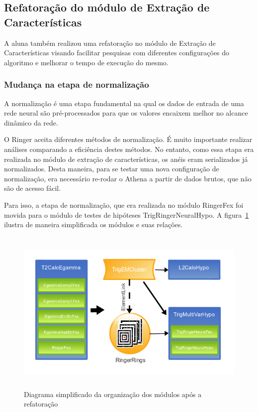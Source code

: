 \documentclass[a4paper,10pt,titlepage]{article}
\begin{document}
\subsection{Refatoração do módulo de Extração de Características}

A aluna também realizou uma refatoração no módulo de Extração de Características visando facilitar pesquisas com diferentes configurações do algoritmo e melhorar o tempo de execução do mesmo.

\subsubsection{Mudança na etapa de normalização}

A normalização é uma etapa fundamental na qual os dados de entrada de uma rede neural são pré-processados para que os valores encaixem melhor no alcance dinâmico da rede.

O Ringer aceita diferentes métodos de normalização.
É muito importante realizar análises comparando a eficiência destes métodos.
No entanto, como essa etapa era realizada no módulo de extração de características, os anéis eram serializados já normalizados.
Desta maneira, para se testar uma nova configuração de normalização, era necessário re-rodar o Athena a partir de dados brutos, que não são de acesso fácil.

Para isso, a etapa de normalização, que era realizada no módulo RingerFex foi movida para o módulo de testes de hipóteses TrigRingerNeuralHypo. A figura~\ref{fig:move_normalization} ilustra de maneira simplificada os módulos e suas relações.

\begin{figure}[htbp!]
 \centering
 \includegraphics[width=12cm,height=8cm]{Figs/egamma_refactoring/move_normalization.png}
 \caption{Diagrama simplificado da organização dos módulos após a refatoração}
 \label{fig:move_normalization}
\end{figure}
\end{document}
